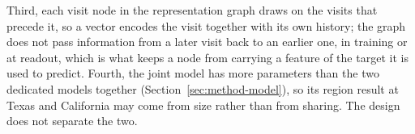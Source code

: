 Third, each
visit node in the representation graph draws on the visits that precede it, so a vector encodes the visit
together with its own history; the graph does not pass information from a later visit back to an earlier
one, in training or at readout, which is what keeps a node from carrying a feature of the target it is
used to predict. Fourth, the joint model has more parameters than the two dedicated models together
(Section~\ref{sec:method-model}), so its region result at Texas and California may come from size
rather than from sharing. The design does not separate the two.

